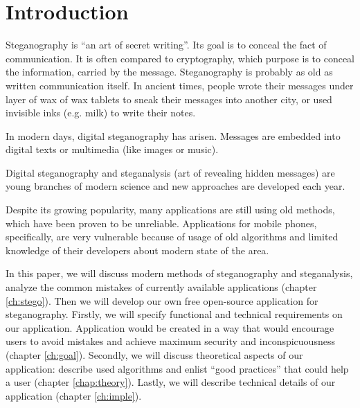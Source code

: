 \chapter*{Introduction}


Steganography is ``an art of secret writing''. Its goal is 
to conceal the fact of communication. It is often compared
to cryptography, which purpose is to conceal the information,
carried by the message. Steganography is probably as old as written
communication itself. In ancient times, people wrote their messages
under layer of wax of wax tablets to sneak their messages into another
city, or used invisible inks (e.g. milk) to write their notes.

In modern days, digital steganography has arisen. Messages are embedded
into digital texts or multimedia (like images or music).

Digital steganography and steganalysis (art of revealing hidden messages) 
are young branches of modern science and new approaches are developed each year.

Despite its growing popularity, many applications are still using old methods,
which have been proven to be unreliable. Applications for mobile phones, specifically,
are very vulnerable because of usage of old algorithms and limited knowledge of their
developers about modern state of the area.

In this paper, we will discuss modern methods of steganography and steganalysis, analyze
the common mistakes of currently available applications (chapter \ref{ch:stego}). Then we
will develop our own free open-source application for steganography. Firstly, we will specify
functional and technical requirements on our application. Application would be created in a way
that would encourage users to avoid mistakes and achieve maximum security and inconspicuousness
(chapter \ref{ch:goal}). Secondly, we will discuss theoretical aspects of our application: describe
used algorithms and enlist ``good practices'' that could help a user (chapter \ref{chap:theory}).
Lastly, we will describe technical details of our application (chapter \ref{ch:imple}).
